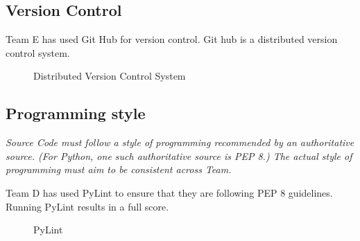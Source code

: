   \subsection{Version Control}
  \begin{flushleft}
    Team E has used Git Hub for version control. Git hub is a distributed version control system.
    \begin{figure}[h!]
        \centering
        \caption{Distributed Version Control System}
        \label{fig:GitHub repo}
      \end{figure}
  \end{flushleft}

  \subsection{Programming style}
\begin{flushleft}
  \textit{Source Code must follow a style of programming recommended by an authoritative source. (For 
Python, one such authoritative source is PEP 8.) The actual style of programming must 
aim to be consistent across Team.}
\end{flushleft}
\begin{flushleft}
    Team D has used PyLint to ensure that they are following PEP 8 guidelines. Running PyLint results in a full score.
    \begin{figure}[h!]
        \centering
        \caption{PyLint}
        \label{fig:PyLint}
      \end{figure}
\end{flushleft}
